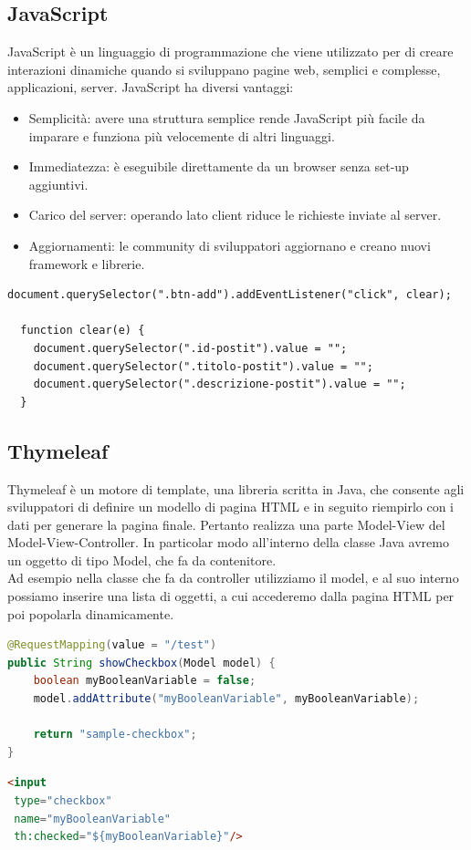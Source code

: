\subsection{JavaScript}
JavaScript è un linguaggio di programmazione che viene utilizzato per di creare interazioni dinamiche quando si sviluppano pagine web, semplici e complesse, applicazioni, server. \cite{javascript}
JavaScript ha diversi vantaggi:
\begin{itemize}
    \item Semplicità: avere una struttura semplice rende JavaScript più facile da imparare e funziona più velocemente di altri linguaggi.
    \item Immediatezza: è eseguibile direttamente da un browser senza set-up aggiuntivi.
    \item Carico del server: operando lato client riduce le richieste inviate al server.
    \item Aggiornamenti: le community di sviluppatori aggiornano e creano nuovi framework e librerie.
\end{itemize}
\begin{lstlisting}[basicstyle=\small, caption={Esempio di script JavaScript}, captionpos=b]
document.querySelector(".btn-add").addEventListener("click", clear);

  function clear(e) {
    document.querySelector(".id-postit").value = "";
    document.querySelector(".titolo-postit").value = "";
    document.querySelector(".descrizione-postit").value = "";
  }
\end{lstlisting}
\newpage
\subsection{Thymeleaf}
Thymeleaf è un motore di template, una libreria scritta in Java, che consente agli sviluppatori di definire un modello di pagina HTML e in seguito riempirlo con i dati per generare la pagina finale.
Pertanto realizza una parte Model-View del Model-View-Controller.\cite{thymeleaf}
In particolar modo all'interno della classe Java avremo un oggetto di tipo Model, che fa da contenitore.\\
Ad esempio nella classe che fa da controller utilizziamo il model, e al suo interno possiamo inserire una lista di oggetti, a cui accederemo dalla pagina HTML per poi popolarla dinamicamente.\\
\begin{lstlisting}[language=java, basicstyle=\small, caption={Esempio di utilizzo del contenitore Model in un metodo del controller}, captionpos=b]
@RequestMapping(value = "/test")
public String showCheckbox(Model model) {
    boolean myBooleanVariable = false;
    model.addAttribute("myBooleanVariable", myBooleanVariable);
     
    return "sample-checkbox";
}
\end{lstlisting}

\begin{lstlisting}[language=html, basicstyle=\small, caption={Esempio di utilizzo di un attributo del Model all'interno della pagina HTML}, captionpos=b]
<input
 type="checkbox"
 name="myBooleanVariable"
 th:checked="${myBooleanVariable}"/>
\end{lstlisting}